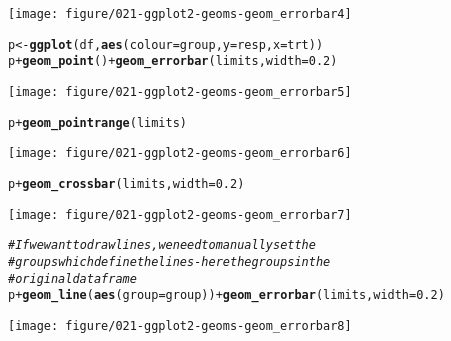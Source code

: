 \documentclass[a4paper,titlepage]{tufte-handout}\usepackage[]{graphicx}\usepackage[]{color}
\makeatletter
\def\maxwidth{ %
  \ifdim\Gin@nat@width>\linewidth
    \linewidth
  \else
    \Gin@nat@width
  \fi
}
\newcommand{\hlnum}[1]{\textcolor[rgb]{0.686,0.059,0.569}{#1}}%
\newcommand{\hlcom}[1]{\textcolor[rgb]{0.678,0.584,0.686}{\textit{#1}}}%
\newcommand{\hlopt}[1]{\textcolor[rgb]{0,0,0}{#1}}%
\newcommand{\hlstd}[1]{\textcolor[rgb]{0.345,0.345,0.345}{#1}}%
\newcommand{\hlkwb}[1]{\textcolor[rgb]{0.69,0.353,0.396}{#1}}%
\newcommand{\hlkwc}[1]{\textcolor[rgb]{0.333,0.667,0.333}{#1}}%
\newcommand{\hlkwd}[1]{\textcolor[rgb]{0.737,0.353,0.396}{\textbf{#1}}}%
\newenvironment{kframe}{%
 \def\at@end@of@kframe{}%
 \ifinner\ifhmode%
  \def\at@end@of@kframe{\end{minipage}}%
  \begin{minipage}{\columnwidth}%
 \fi\fi%
 \def\FrameCommand##1{\hskip\@totalleftmargin \hskip-\fboxsep
 \colorbox{shadecolor}{##1}\hskip-\fboxsep
     \hskip-\linewidth \hskip-\@totalleftmargin \hskip\columnwidth}%
 \MakeFramed {\advance\hsize-\width
   \@totalleftmargin\z@ \linewidth\hsize
   \@setminipage}}%
 {\par\unskip\endMakeFramed%
 \at@end@of@kframe}
\newenvironment{knitrout}{}{} %
\makeatother
\begin{document}
\begin{knitrout}
\begin{kframe}
{\ttfamily\noindent\itshape{}}\end{kframe}
\texttt{[image: figure/021-ggplot2-geoms-geom\_errorbar4]} 
\begin{kframe}\begin{alltt}
\hlstd{p} \hlkwb{<-} \hlkwd{ggplot}\hlstd{(df,} \hlkwd{aes}\hlstd{(}\hlkwc{colour}\hlstd{=group,} \hlkwc{y}\hlstd{=resp,} \hlkwc{x}\hlstd{=trt))}
\hlstd{p} \hlopt{+} \hlkwd{geom_point}\hlstd{()} \hlopt{+} \hlkwd{geom_errorbar}\hlstd{(limits,} \hlkwc{width}\hlstd{=}\hlnum{0.2}\hlstd{)}
\end{alltt}
\end{kframe}
\texttt{[image: figure/021-ggplot2-geoms-geom\_errorbar5]} 
\begin{kframe}\begin{alltt}
\hlstd{p} \hlopt{+} \hlkwd{geom_pointrange}\hlstd{(limits)}
\end{alltt}
\end{kframe}
\texttt{[image: figure/021-ggplot2-geoms-geom\_errorbar6]} 
\begin{kframe}\begin{alltt}
\hlstd{p} \hlopt{+} \hlkwd{geom_crossbar}\hlstd{(limits,} \hlkwc{width}\hlstd{=}\hlnum{0.2}\hlstd{)}
\end{alltt}
\end{kframe}
\texttt{[image: figure/021-ggplot2-geoms-geom\_errorbar7]} 
\begin{kframe}\begin{alltt}
\hlcom{# If we want to draw lines, we need to manually set the}
\hlcom{# groups which define the lines - here the groups in the}
\hlcom{# original dataframe}
\hlstd{p} \hlopt{+} \hlkwd{geom_line}\hlstd{(}\hlkwd{aes}\hlstd{(}\hlkwc{group}\hlstd{=group))} \hlopt{+} \hlkwd{geom_errorbar}\hlstd{(limits,} \hlkwc{width}\hlstd{=}\hlnum{0.2}\hlstd{)}
\end{alltt}
\end{kframe}
\texttt{[image: figure/021-ggplot2-geoms-geom\_errorbar8]} 
\begin{kframe}\begin{alltt}


\end{alltt}
\end{kframe}
\end{knitrout}
\end{document}
